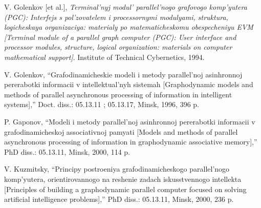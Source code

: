 \documentclass{article}
\begin{document}
{\begin{multicols}{2}
{\begin{enumerate}[label={[\arabic*]}]
    \item V. Golenkov [et al.], \textit{Terminal’nyj modul’ parallel’nogo grafovogo
komp’yutera (PGC): Interfejs s pol’zovatelem i processornymi
modulyami, struktura, logicheskaya organizaciya: materialy po
matematicheskomu obespecheniyu EVM [Terminal module of a
parallel graph computer (PGC): User interface and processor
modules, structure, logical organization: materials on computer
mathematical support]}. Institute of Technical Cybernetics, 1994.
    \item V. Golenkov, “Grafodinamicheskie modeli i metody parallel’noj
asinhronnoj pererabotki informacii v intellektual’nyh sistemah
[Graphodynamic models and methods of parallel asynchronous
processing of information in intelligent systems],” Doct. diss.:
05.13.11 ; 05.13.17, Minsk, 1996, 396 p.
    \item P. Gaponov, “Modeli i metody parallel’noj asinhronnoj pererabotki
informacii v grafodinamicheskoj associativnoj pamyati [Models
and methods of parallel asynchronous processing of information in
graphodynamic associative memory],” PhD diss.: 05.13.11, Minsk,
2000, 114 p.

    \item V. Kuzmitsky, “Principy postroeniya grafodinamicheskogo
parallel’nogo komp’yutera, orientirovannogo na reshenie zadach
iskusstvennogo intellekta [Principles of building a graphodynamic
parallel computer focused on solving artificial intelligence
problems],” PhD diss.: 05.13.11, Minsk, 2000, 236 p.


\end{enumerate}
}


\end{multicols}
}
\end{document}
